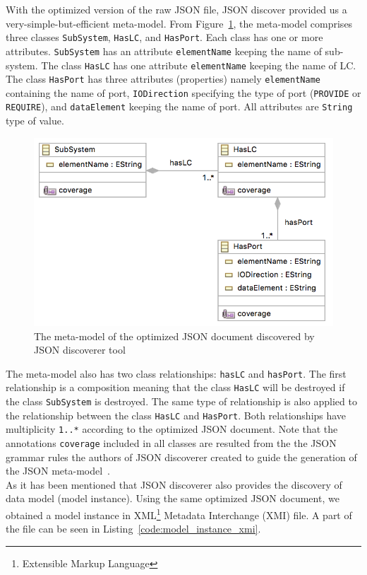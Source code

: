 With the optimized version of the raw JSON file, JSON discover provided us a very-simple-but-efficient meta-model. From Figure~\ref{fig:new_metamodel}, the meta-model comprises three classes \texttt{SubSystem}, \texttt{HasLC}, and \texttt{HasPort}. Each class has one or more attributes. \texttt{SubSystem} has an attribute \texttt{elementName} keeping the name of sub-system. The class \texttt{HasLC} has one attribute \texttt{elementName} keeping the name of LC. The class \texttt{HasPort} has three attributes (properties) namely \texttt{elementName} containing the name of port, \texttt{IODirection} specifying the type of port (\texttt{PROVIDE} or \texttt{REQUIRE}), and \texttt{dataElement} keeping the name of port. All attributes are \texttt{String} type of value.

\begin{figure}[H]
\centering
\captionsetup{justification=centering}
\vspace{0cm}%
\includegraphics[width=0.65\linewidth]{figure/new_model/new_metamodel.png}
\caption{The meta-model of the optimized JSON document discovered by JSON discoverer tool}
\label{fig:new_metamodel}
\end{figure}

The meta-model also has two class relationships: \texttt{hasLC} and \texttt{hasPort}. The first relationship is a composition meaning that the class \texttt{HasLC} will be destroyed if the class \texttt{SubSystem} is destroyed. The same type of relationship is also applied to the relationship between the class \texttt{HasLC} and \texttt{HasPort}. Both relationships have multiplicity \texttt{1..*} according to the optimized JSON document. Note that the annotations \texttt{coverage} included in all classes are resulted from the the JSON grammar rules the authors of JSON discoverer created to guide the generation of the JSON meta-model~\cite{Canovas}. \\

As it has been mentioned that JSON discoverer also provides the discovery of data model (model instance). Using the same optimized JSON document, we obtained a model instance in XML\footnote{Extensible Markup Language} Metadata Interchange (XMI) file. A part of the file can be seen in Listing~\ref{code:model_instance_xmi}.

